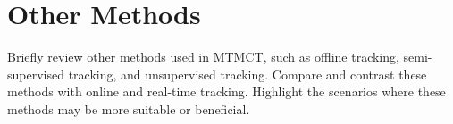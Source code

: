 \chapter{Other Methods}\label{chap:other_methods}

Briefly review other methods used in MTMCT, such as offline tracking, semi-supervised tracking, and unsupervised tracking.
Compare and contrast these methods with online and real-time tracking.
Highlight the scenarios where these methods may be more suitable or beneficial.

